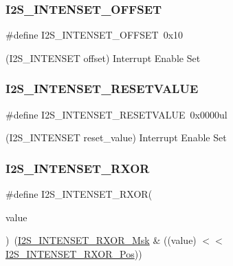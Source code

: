 \subsubsection{\texorpdfstring{I2S\_INTENSET\_OFFSET}{I2S\_INTENSET\_OFFSET}}
{\footnotesize\ttfamily \#define I2\+S\+\_\+\+I\+N\+T\+E\+N\+S\+E\+T\+\_\+\+O\+F\+F\+S\+ET~0x10}



(I2\+S\+\_\+\+I\+N\+T\+E\+N\+S\+ET offset) Interrupt Enable Set 

\mbox{\label{group___s_a_m_d21___i2_s_gaf0d24a1632b21dc544a62f9ba89478e3}} 
\subsubsection{\texorpdfstring{I2S\_INTENSET\_RESETVALUE}{I2S\_INTENSET\_RESETVALUE}}
{\footnotesize\ttfamily \#define I2\+S\+\_\+\+I\+N\+T\+E\+N\+S\+E\+T\+\_\+\+R\+E\+S\+E\+T\+V\+A\+L\+UE~0x0000ul}



(I2\+S\+\_\+\+I\+N\+T\+E\+N\+S\+ET reset\+\_\+value) Interrupt Enable Set 

\mbox{\label{group___s_a_m_d21___i2_s_ga26372a31c0ce9cb1a0c88819151b1236}} 
\subsubsection{\texorpdfstring{I2S\_INTENSET\_RXOR}{I2S\_INTENSET\_RXOR}}
{\footnotesize\ttfamily \#define I2\+S\+\_\+\+I\+N\+T\+E\+N\+S\+E\+T\+\_\+\+R\+X\+OR(\begin{DoxyParamCaption}\item[{}]{value }\end{DoxyParamCaption})~(\mbox{\hyperlink{group___s_a_m_d21___i2_s_ga0865f7837ebba5f593483a57f854099f}{I2\+S\+\_\+\+I\+N\+T\+E\+N\+S\+E\+T\+\_\+\+R\+X\+O\+R\+\_\+\+Msk}} \& ((value) $<$$<$ \mbox{\hyperlink{group___s_a_m_d21___i2_s_ga85f713671974c54bdf903cbc6767f5d0}{I2\+S\+\_\+\+I\+N\+T\+E\+N\+S\+E\+T\+\_\+\+R\+X\+O\+R\+\_\+\+Pos}}))}

